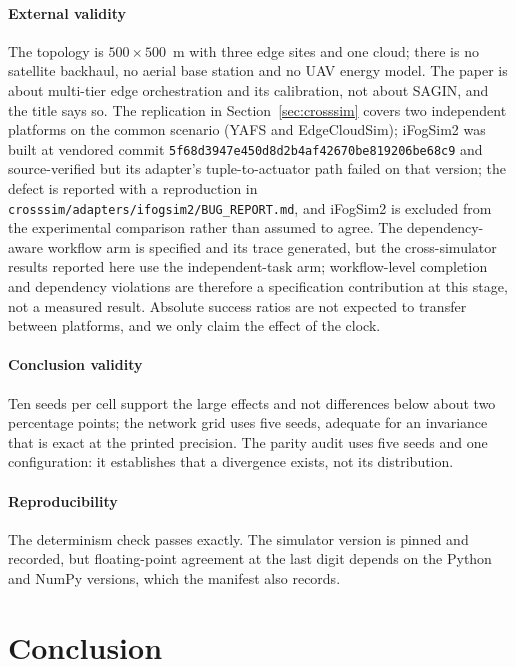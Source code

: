 \documentclass[journal,10pt]{IEEEtran}
\begin{document}
\paragraph{External validity}
The topology is $500\times500$~m with three edge sites and one cloud; there is no
satellite backhaul, no aerial base station and no UAV energy model. The paper is
about multi-tier edge orchestration and its calibration, not about SAGIN, and
the title says so. The replication in Section~\ref{sec:crosssim} covers two independent platforms on the common scenario (YAFS and EdgeCloudSim);
iFogSim2 was built at vendored commit
\texttt{5f68d3947e450d8d2b4af42670be819206be68c9} and source-verified but its
adapter's tuple-to-actuator path failed on that version; the defect is reported
with a reproduction in \texttt{crosssim/adapters/ifogsim2/BUG\_REPORT.md}, and
iFogSim2 is excluded from the experimental comparison rather than assumed to
agree. The
dependency-aware workflow arm is specified and its trace generated, but the
cross-simulator results reported here use the independent-task arm; workflow-level
completion and dependency violations are therefore a specification contribution
at this stage, not a measured result. Absolute success ratios are not expected to
transfer between platforms, and we only claim the effect of the clock.

\paragraph{Conclusion validity}
Ten seeds per cell support the large effects and not differences below about two
percentage points; the network grid uses five seeds, adequate for an invariance
that is exact at the printed precision. The parity audit uses five seeds and one
configuration: it establishes that a divergence exists, not its distribution.

\paragraph{Reproducibility}
The determinism check passes exactly. The simulator version is pinned and
recorded, but floating-point agreement at the last digit depends on the Python
and NumPy versions, which the manifest also records.

\section{Conclusion}
\label{sec:concl}
\end{document}
